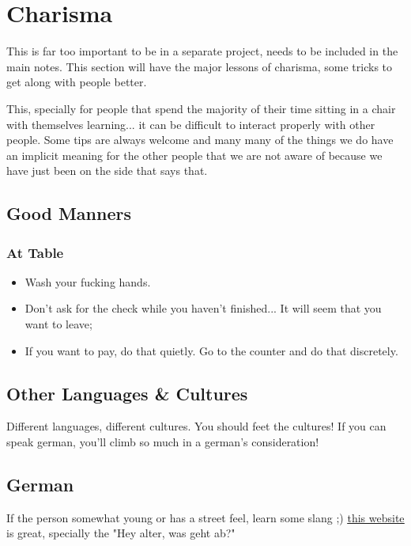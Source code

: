 \section{Charisma}

This is far too important to be in a separate project, needs to be included in the main notes.
This section will have the major lessons of charisma, some tricks to get along with people better.

This, specially for people that spend the majority of their time sitting in a chair with themselves learning... it can be difficult to interact properly with other people. Some tips are always welcome and many many of the things we do have an implicit meaning for the other people that we are not aware of because we have just been on the side that says that.

\subsection{Good Manners}
\subsubsection{At Table}
\begin{itemize}
    \item Wash your fucking hands.
    \item Don't ask for the check while you haven't finished... It will seem that you want to leave;
    \item If you want to pay, do that quietly. Go to the counter and do that discretely.
\end{itemize}

\subsection{Other Languages \& Cultures}

Different languages, different cultures. You should feet the cultures! If you can speak german, you'll climb so much in a german's consideration!


\subsection{German}

If the person somewhat young or has a street feel, learn some slang ;)
\href{https://www.fluentin3months.com/german-slang/}{\ul{this website}} is great, specially the "Hey alter, was geht ab?"



